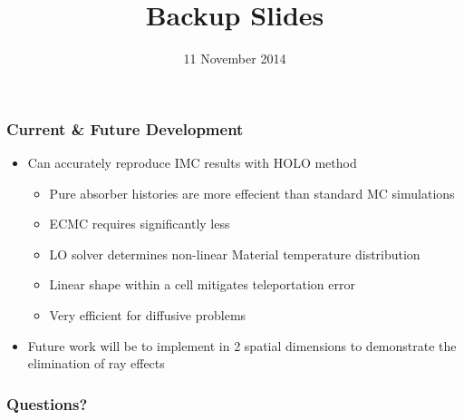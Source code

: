 \documentclass[xcolor=dvipsnames,handout,hyperref={pdfpagelabels=false}]{beamer}
\newcommand{\coly}[1]{{\color{yellow} #1}}
\newlength{\wideitemsep}
\let\olditem\item
\renewcommand{\item}{\setlength{\itemsep}{\wideitemsep}\olditem}
\begin{document}
\begin{frame}
    \frametitle{Current \& Future Development}
    \begin{itemize}
        \item Can accurately reproduce IMC results with HOLO method
        \begin{itemize}
            \item Pure absorber histories are more effecient than standard MC simulations
            \item ECMC requires significantly less 
            \item LO solver determines non-linear Material temperature distribution
            \item Linear shape within a cell mitigates teleportation error
            \item Very efficient for diffusive problems
        \end{itemize}
    \item Future work will be to implement in 2 spatial dimensions to demonstrate the
        elimination of ray effects
    \end{itemize}
\end{frame}


\date{11 November 2014}

\begin{frame}
    \frametitle{{\LARGE\coly{Questions?}}}
    \titlepage \vspace{-0.113in}
\end{frame}

\appendix
{}
\setcounter{finalframe}{\value{framenumber}}

\title{Backup Slides}
\author{}
\date{}

\begin{frame}
    \titlepage
\end{frame}
\end{document}
